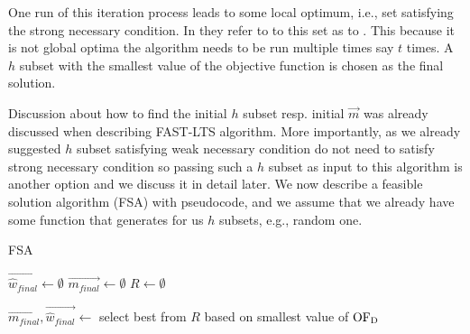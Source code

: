 One run of this iteration process leads to some local optimum, i.e., set satisfying the strong necessary condition. In \cite{hawkins:1994} they refer to to this set as to .
This because it is not global optima the algorithm needs to be run multiple times say $t$ times. A $h$  subset with the smallest value of the objective function is chosen as the final solution.

Discussion about how to find the initial $h$ subset resp. initial $\vec{m}$ was already discussed when describing FAST-LTS algorithm.
More importantly, as we already suggested $h$ subset satisfying weak necessary condition do not need to satisfy strong necessary condition so passing such a $h$ subset as input to this algorithm is another option and we discuss it in detail later. We now describe a feasible solution algorithm (FSA) with pseudocode, and we assume that we already have some function that generates for us $h$ subsets, e.g., random one. 

\newcommand\mycommfont[1]{\footnotesize\ttfamily\textcolor{blue}{#1}}

\begin{algorithm}[H]
    \label{alg:feasible_solution}
        
    \caption{FSA}
    $\vec{\hat{w}_{final}} \gets \emptyset$\;
    $\vec{m_{final}} \gets \emptyset$\;
    $R \gets \emptyset$\;

    $\vec{m_{final}}, \vec{\hat{w}_{final}}  \gets $ select best from $R$ based on smallest value of $\operatorname{OF_D}$\;
    \;
\end{algorithm}



